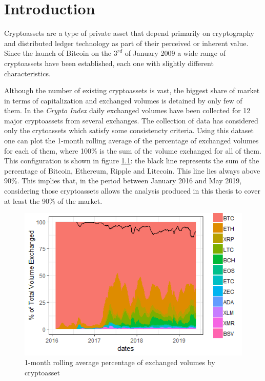 \chapter{Introduction}
\label{chpr:intro}
\bigskip

Cryptoassets are a type of private asset that depend primarily on cryptography and distributed ledger technology as part of their perceived or inherent value. Since the launch of Bitcoin on the $3^{rd}$ of January 2009 a wide range of cryptoassets have been established, each one with slightly different characteristics.

\bigskip
Although the number of existing cryptoassets is vast, the biggest share of market in terms of capitalization and exchanged volumes is detained by only few of them. In the  \textit{Crypto Index} \citep{cryptoindex} daily exchanged volumes have been collected for 12 major cryptoassets from several exchanges. The collection of data has considered only the crytoassets which satisfy some consistencty criteria. Using this dataset one can plot the 1-month rolling average of the percentage of exchanged volumes for each of them, where 100\% is the sum of the volume exchanged for all of them. This configuration is shown in figure \ref{introfigure}: the black line represents the sum of the percentage of Bitcoin, Ethereum, Ripple and Litecoin. This line lies always above 90\%. This implies that, in the period between January 2016 and May 2019, considering those cryptoassets allows the analysis produced in this thesis to cover at least the 90\% of the market.


\begin{figure}[H]
		\centering
		\includegraphics[width=12.5cm]{Images/tot_volumi.png} %
        \caption{1-month rolling average percentage of exchanged volumes by cryptoasset}
        \label{introfigure}
\end{figure}

